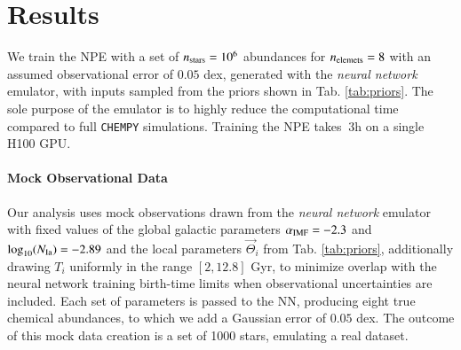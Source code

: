 \documentclass{aa}
\begin{document}






\section{Results}
\label{sec: Results}


We train the NPE with a set of $n_{\rm stars}=10^6$ abundances for $n_{\rm elemets}=8$ with an assumed observational error of $0.05$ dex, generated with the \textit{neural network} emulator, with inputs sampled from the priors shown in Tab. \ref{tab:priors}. The sole purpose of the emulator is to highly reduce the computational time compared to full \texttt{CHEMPY} simulations. Training the NPE takes $~3$h on a single H100 GPU.

\paragraph{Mock Observational Data}
Our analysis uses mock observations drawn from the \textit{neural network} emulator with fixed values of the global galactic parameters $\alpha_{\rm IMF}=-2.3$ and $\log_{10}(N_{\rm Ia})=-2.89$ and the local parameters $\vec{\Theta}_i$ from Tab. \ref{tab:priors}, additionally drawing $T_i$ uniformly in the range $[2,12.8]$ Gyr, to minimize overlap with the neural network training birth-time limits when observational uncertainties are included. 
Each set of parameters is passed to the NN, producing eight true chemical abundances, to which we add a Gaussian error of $0.05$ dex.
The outcome of this mock data creation is a set of 1000 stars, emulating a real dataset.
\end{document}
